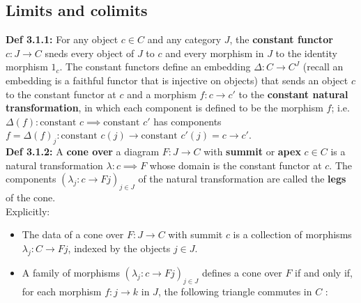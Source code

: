\documentclass[a4paper]{article}
\begin{document}
\subsection*{Limits and colimits}

\textbf{Def 3.1.1:} For any object $c \in C$ and any category
$J$, the \textbf{constant functor} $c  \colon J \to C$ sneds every object of
$J$ to $c$ and every morphism in $J$ to the identity morphism $1_c$. The
constant functors define an embedding $\Delta  \colon C 
\to C^{J}$ (recall an embedding is a faithful functor that is injective on
objects) that sends an object $c$ to the constant functor at $c$ and a morphism
$f  \colon c \to c'$ to the \textbf{constant natural transformation}, in
which each component is defined to be the morphism $f$; i.e.
$\Delta (f)  \colon \text{constant }c \implies \text{constant }c'$ has
components $f = \Delta(f)_j  \colon
\text{constant }c (j) \to \text{constant }c'(j)
= c \to c'$.\\
\linebreak
\textbf{Def 3.1.2:} A \textbf{cone over} a diagram
$F  \colon J \to C$ with \textbf{summit} or \textbf{apex} $c \in C$ is
a natural transformation $\lambda  \colon c \implies F$ whose domain is the
constant functor at $c$. The components 
$\left( \lambda_j  \colon c \to Fj \right)_{j \in J}$ of the natural
transformation are called the \textbf{legs} of the cone.\\
Explicitly:
\begin{itemize}
    \item The data of a cone over $F  \colon J \to C$ with summit $c$ is
        a collection of morphisms $\lambda_j  \colon C \to Fj$, indexed by the
        objects $j \in J$.
    \item A family of morphisms $\left( 
        \lambda_j  \colon c \to Fj \right)_{j \in J}$ defines a cone over $F$ 
        if and only if, for each morphism $f  \colon j\to k$ in $J$, the
        following triangle commutes in $C$ :
\end{itemize}
\end{document}
